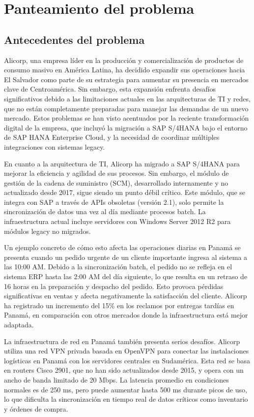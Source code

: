 \section{Panteamiento del problema}
\subsection{Antecedentes del problema}

Alicorp, una empresa líder en la producción y comercialización de productos de consumo masivo en América Latina, ha decidido expandir sus operaciones hacia El Salvador como parte de su estrategia para aumentar su presencia en mercados clave de Centroamérica. Sin embargo, esta expansión enfrenta desafíos significativos debido a las limitaciones actuales en las arquitecturas de TI y redes, que no están completamente preparadas para manejar las demandas de un nuevo mercado. Estos problemas se han visto acentuados por la reciente transformación digital de la empresa, que incluyó la migración a SAP S/4HANA bajo el entorno de SAP HANA Enterprise Cloud, y la necesidad de coordinar múltiples integraciones con sistemas legacy.

En cuanto a la arquitectura de TI, Alicorp ha migrado a SAP S/4HANA para mejorar la eficiencia y agilidad de sus procesos. Sin embargo, el módulo de gestión de la cadena de suministro (SCM), desarrollado internamente y no actualizado desde 2017, sigue siendo un punto débil crítico. Este módulo, que se integra con SAP a través de APIs obsoletas (versión 2.1), solo permite la sincronización de datos una vez al día mediante procesos batch. La infraestructura actual incluye servidores con Windows Server 2012 R2 para módulos legacy no migrados.

Un ejemplo concreto de cómo esto afecta las operaciones diarias en Panamá se presenta cuando un pedido urgente de un cliente importante ingresa al sistema a las 10:00 AM. Debido a la sincronización batch, el pedido no se refleja en el sistema ERP hasta las 2:00 AM del día siguiente, lo que resulta en un retraso de 16 horas en la preparación y despacho del pedido. Esto provoca pérdidas significativas en ventas y afecta negativamente la satisfacción del cliente. Alicorp ha registrado un incremento del 15\% en los reclamos por entregas tardías en Panamá, en comparación con otros mercados donde la infraestructura está mejor adaptada.

La infraestructura de red en Panamá también presenta serios desafíos. Alicorp utiliza una red VPN privada basada en OpenVPN para conectar las instalaciones logísticas en Panamá con los servidores centrales en Sudamérica. Esta red se basa en routers Cisco 2901, que no han sido actualizados desde 2015, y opera con un ancho de banda limitado de 20 Mbps. La latencia promedio en condiciones normales es de 250 ms, pero puede aumentar hasta 500 ms durante picos de uso, lo que dificulta la sincronización en tiempo real de datos críticos como inventario y órdenes de compra.


